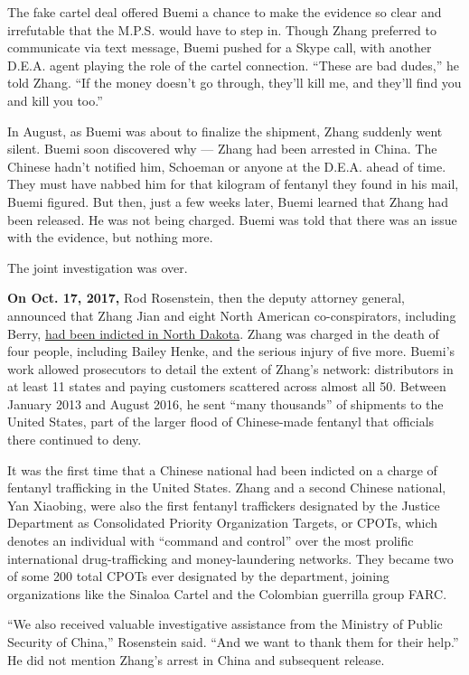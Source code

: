 The fake cartel deal offered Buemi a chance to make the evidence so
clear and irrefutable that the M.P.S. would have to step in. Though
Zhang preferred to communicate via text message, Buemi pushed for a
Skype call, with another D.E.A. agent playing the role of the cartel
connection. ``These are bad dudes,'' he told Zhang. ``If the money
doesn't go through, they'll kill me, and they'll find you and kill you
too.''

In August, as Buemi was about to finalize the shipment, Zhang suddenly
went silent. Buemi soon discovered why --- Zhang had been arrested in
China. The Chinese hadn't notified him, Schoeman or anyone at the D.E.A.
ahead of time. They must have nabbed him for that kilogram of fentanyl
they found in his mail, Buemi figured. But then, just a few weeks later,
Buemi learned that Zhang had been released. He was not being charged.
Buemi was told that there was an issue with the evidence, but nothing
more.

The joint investigation was over.

\textbf{On Oct. 17, 2017,} Rod Rosenstein, then the deputy attorney
general, announced that Zhang Jian and eight North American
co-conspirators, including Berry,
\href{https://www.justice.gov/opa/speech/deputy-attorney-general-rod-j-rosenstein-delivers-remarks-enforcement-actions-stop-deadly}{had
been indicted in North Dakota}. Zhang was charged in the death of four
people, including Bailey Henke, and the serious injury of five more.
Buemi's work allowed prosecutors to detail the extent of Zhang's
network: distributors in at least 11 states and paying customers
scattered across almost all 50. Between January 2013 and August 2016, he
sent ``many thousands'' of shipments to the United States, part of the
larger flood of Chinese-made fentanyl that officials there continued to
deny.

It was the first time that a Chinese national had been indicted on a
charge of fentanyl trafficking in the United States. Zhang and a second
Chinese national, Yan Xiaobing, were also the first fentanyl traffickers
designated by the Justice Department as Consolidated Priority
Organization Targets, or CPOTs, which denotes an individual with
``command and control'' over the most prolific international
drug-trafficking and money-laundering networks. They became two of some
200 total CPOTs ever designated by the department, joining organizations
like the Sinaloa Cartel and the Colombian guerrilla group FARC.

``We also received valuable investigative assistance from the Ministry
of Public Security of China,'' Rosenstein said. ``And we want to thank
them for their help.'' He did not mention Zhang's arrest in China and
subsequent release.

